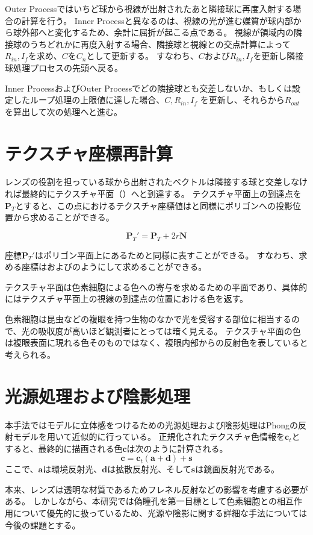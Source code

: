 Outer Processではいちど球から視線が出射されたあと隣接球に再度入射する場合の計算を行う。
Inner Processと異なるのは、視線の光が進む媒質が球内部から球外部へと変化するため、余計に屈折が起こる点である。
視線が領域内の隣接球のうちどれかに再度入射する場合、隣接球と視線との交点計算によって$R_{in}, I_f$を求め、$C$を$C_n$として更新する。
すなわち、$C$および$R_{in}, I_f$を更新し隣接球処理プロセスの先頭へ戻る。

Inner ProcessおよびOuter Processでどの隣接球とも交差しないか、もしくは設定したループ処理の上限値に達した場合、$C, R_{in}, I_f$
を更新し、それらから$R_{out}$を算出して次の処理へと進む。

\section{テクスチャ座標再計算}
\label{STexturerecalculation}

レンズの役割を担っている球から出射されたベクトルは隣接する球と交差しなければ最終的にテクスチャ平面（）へと到達する。
テクスチャ平面上の到達点を$\bm{P}_T$とすると、この点におけるテクスチャ座標値はと同様にポリゴンへの投影位置から求めることができる。

\begin{equation}
\label{EPtdash}
\bm{P}_T' = \bm{P}_T + 2r\bm{N}
\end{equation}

\noindent
座標$\bm{P}_T'$はポリゴン平面上にあるためと同様に表すことができる。
すなわち、求める座標はおよびのようにして求めることができる。


テクスチャ平面は色素細胞による色への寄与を求めるための平面であり、具体的にはテクスチャ平面上の視線の到達点の位置における色を返す。

色素細胞は昆虫などの複眼を持つ生物のなかで光を受容する部位に相当するので、光の吸収度が高いほど観測者にとっては暗く見える。
テクスチャ平面の色は複眼表面に現れる色そのものではなく、複眼内部からの反射色を表していると考えられる。



\section{光源処理および陰影処理}
\label{SPhongandshade}

本手法ではモデルに立体感をつけるための光源処理および陰影処理はPhongの反射モデルを用いて近似的に行っている。
正規化されたテクスチャ色情報を$\bm{c}_t$とすると、最終的に描画される色$\bm{c}$は次のように計算される。
\begin{equation}
\label{EColor}
\bm{c} = \bm{c}_t(\bm{a} + \bm{d}) + \bm{s}
\end{equation}
ここで、$\bm{a}$は環境反射光、$\bm{d}$は拡散反射光、そして$\bm{s}$は鏡面反射光である。

本来、レンズは透明な材質であるためフレネル反射などの影響を考慮する必要がある。
しかしながら、本研究では偽瞳孔を第一目標として色素細胞との相互作用について優先的に扱っているため、光源や陰影に関する詳細な手法については今後の課題とする。
